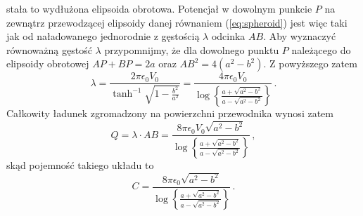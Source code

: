 \documentclass[../main.tex]{subfiles}
\begin{document}
\begin{enumerate}
stała to wydłużona elipsoida obrotowa. Potencjał w dowolnym punkcie \(P\) na zewnątrz przewodzącej
elipsoidy danej równaniem (\ref{eq:spheroid}) jest więc taki jak od naładowanego jednorodnie z
gęstością \(\lambda\) odcinka \(AB\). Aby wyznaczyć równoważną gęstość \(\lambda\) przypomnijmy, że
dla dowolnego punktu \(P\) należącego do elipsoidy obrotowej \(AP+BP=2a\) oraz \(AB^2=4(a^2-b^2)\).
Z powyższego zatem
\begin{equation*}
    \lambda=\frac{2\pi\epsilon_0V_0}{\tanh^{-1}\sqrt{1-\frac{b^2}{a^2}}}=\frac{4\pi\epsilon_0V_0}{\log\left\{\frac{a+\sqrt{a^2-b^2}}{a-\sqrt{a^2-b^2}}\right\}}\,.
\end{equation*}
Całkowity ładunek zgromadzony na powierzchni przewodnika wynosi zatem
\begin{equation*}
    Q=\lambda\cdot AB=\frac{8\pi\epsilon_0V_0\sqrt{a^2-b^2}}{\log\left\{\frac{a+\sqrt{a^2-b^2}}{a-\sqrt{a^2-b^2}}\right\}}\,,
\end{equation*}
skąd pojemność takiego układu to
\begin{equation*}
    C=\frac{8\pi\epsilon_0\sqrt{a^2-b^2}}{\log\left\{\frac{a+\sqrt{a^2-b^2}}{a-\sqrt{a^2-b^2}}\right\}}\,.
\end{equation*}


\end{enumerate}
\end{document}
